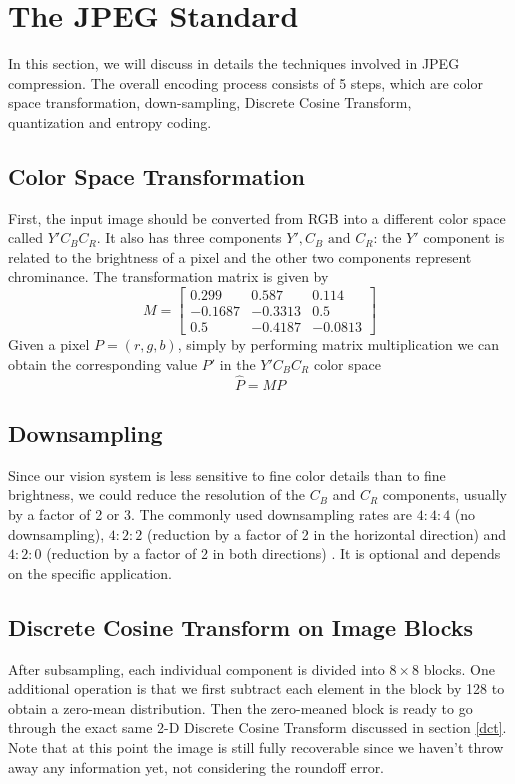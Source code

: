 \documentclass[11pt]{article}
\begin{document}
\section{The JPEG Standard}\label{jpeg_standard}
In this section, we will discuss in details the techniques involved in JPEG compression. The overall encoding process consists of 5 steps, which are color space transformation, down-sampling, Discrete Cosine Transform, \\quantization and entropy coding.
\subsection{Color Space Transformation} 
First, the input image should be converted from RGB into a different color space called $Y'C_BC_R$. It also has three components $Y', C_B\text{ and }C_R$: the $Y'$ component is related to the brightness of a pixel and the other two components represent chrominance. The transformation matrix is given by
\begin{equation}
M = \begin{bmatrix}
0.299 & 0.587 & 0.114 \\
-0.1687 & -0.3313 & 0.5 \\
0.5 & -0.4187 & -0.0813
\end{bmatrix}
\end{equation}
Given a pixel $P = (r, g, b)$, simply by performing matrix multiplication we can obtain the corresponding value $P'$ in the $Y'C_BC_R$ color space
\begin{equation}
\hat{P} = MP
\end{equation} 
\subsection{Downsampling}
Since our vision system is less sensitive to fine color details than to fine brightness, we could reduce the resolution of the $C_B$ and $C_R$ components, usually by a factor of 2 or 3. The commonly used downsampling rates are $4:4:4$ (no downsampling), $4:2:2$ (reduction by a factor of 2 in the horizontal direction) and $4:2:0$ (reduction by a factor of 2 in both directions) \cite{c02}. It is optional and depends on the specific application.

\subsection{Discrete Cosine Transform on Image Blocks}
After subsampling, each individual component is divided into $8\times8$ blocks. One additional operation is that we first subtract each element in the block by 128 to obtain a zero-mean distribution. Then the zero-meaned block is ready to go through the exact same 2-D Discrete Cosine Transform discussed in section \ref{dct}. Note that at this point the image is still fully recoverable since we haven't throw away any information yet, not considering the roundoff error.
\end{document}
